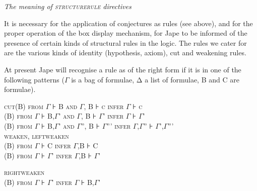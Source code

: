 \documentclass[11pt]{book}
\newcommand{\tab}{\hspace{5mm}}
\begin{document}
\textit{The meaning of \textsc{structurerule} directives}


It is necessary for the application of conjectures as rules (see above), and for the proper operation of the box display mechanism, for Jape to be informed of the presence of certain kinds of structural rules in the logic. The rules we cater for are the various kinds of identity (hypothesis, axiom), cut and weakening rules.


At present Jape will recognise a rule as of the right form if it is in one of the following patterns (\ensuremath{\Gamma} is a bag of formulae, Δ a list of formulae, B and C are formulae).


\textsc{cut\tab (B) from} \textsc{{\large \ensuremath{\Gamma}}} \textsc{⊦} \textsc{B and} \textsc{{\large \ensuremath{\Gamma}}}\textsc{, B} \textsc{⊦} \textsc{{\large c}} \textsc{infer} \textsc{{\large \ensuremath{\Gamma}}} \textsc{⊦} \textsc{{\large c}}\\
\textsc{(B) from} \textsc{{\large \ensuremath{\Gamma}}} \textsc{⊦} \textsc{B,}\textsc{{\large \ensuremath{\Gamma}}}\textsc{'} \textsc{and} \textsc{{\large \ensuremath{\Gamma}}}\textsc{, B} \textsc{⊦} \textsc{{\large \ensuremath{\Gamma}}}\textsc{'} \textsc{infer} \textsc{{\large \ensuremath{\Gamma}}} \textsc{⊦} \textsc{{\large \ensuremath{\Gamma}}}\textsc{'}\\
\textsc{(B) from} \textsc{{\large \ensuremath{\Gamma}}} \textsc{⊦} \textsc{B,}\textsc{{\large \ensuremath{\Gamma}}}\textsc{'} \textsc{and} \textsc{{\large \ensuremath{\Gamma}}}\textsc{''}\textsc{, B} \textsc{⊦} \textsc{{\large \ensuremath{\Gamma}}}\textsc{'''} \textsc{infer} \textsc{{\large \ensuremath{\Gamma},\ensuremath{\Gamma}}}\textsc{''} \textsc{⊦} \textsc{{\large \ensuremath{\Gamma}}}\textsc{',}\textsc{\ensuremath{\Gamma}}\textsc{'''}\\
\textsc{weaken, leftweaken\\
(B) from} \textsc{\ensuremath{\Gamma}} \textsc{⊦} \textsc{C infer} \textsc{\ensuremath{\Gamma}}\textsc{,B} \textsc{⊦} \textsc{C \\
(B) from} \textsc{\ensuremath{\Gamma}} \textsc{⊦} \textsc{\ensuremath{\Gamma}}\textsc{'} \textsc{infer} \textsc{\ensuremath{\Gamma}}\textsc{,B} \textsc{⊦} \textsc{\ensuremath{\Gamma}}\textsc{'}

\textsc{rightweaken\\
(B) from} \textsc{\ensuremath{\Gamma}} \textsc{⊦} \textsc{\ensuremath{\Gamma}}\textsc{'} \textsc{infer} \textsc{\ensuremath{\Gamma}} \textsc{⊦} \textsc{B,}\textsc{\ensuremath{\Gamma}}\textsc{'}
\end{document}
